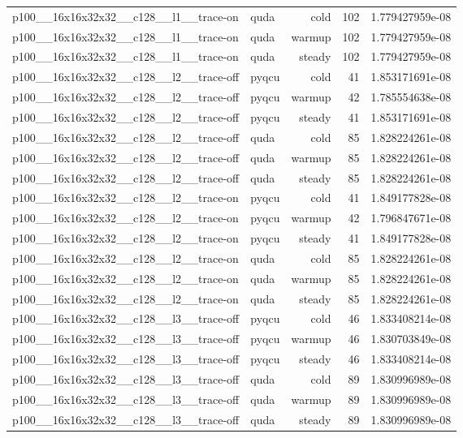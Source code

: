 \begin{table}[htbp]
\begin{tabular}{@{}llrrr@{}}
p100\_\_16x16x32x32\_\_c128\_\_l1\_\_trace-on & quda & cold & 102 & 1.779427959e-08 \\
p100\_\_16x16x32x32\_\_c128\_\_l1\_\_trace-on & quda & warmup & 102 & 1.779427959e-08 \\
p100\_\_16x16x32x32\_\_c128\_\_l1\_\_trace-on & quda & steady & 102 & 1.779427959e-08 \\
p100\_\_16x16x32x32\_\_c128\_\_l2\_\_trace-off & pyqcu & cold & 41 & 1.853171691e-08 \\
p100\_\_16x16x32x32\_\_c128\_\_l2\_\_trace-off & pyqcu & warmup & 42 & 1.785554638e-08 \\
p100\_\_16x16x32x32\_\_c128\_\_l2\_\_trace-off & pyqcu & steady & 41 & 1.853171691e-08 \\
p100\_\_16x16x32x32\_\_c128\_\_l2\_\_trace-off & quda & cold & 85 & 1.828224261e-08 \\
p100\_\_16x16x32x32\_\_c128\_\_l2\_\_trace-off & quda & warmup & 85 & 1.828224261e-08 \\
p100\_\_16x16x32x32\_\_c128\_\_l2\_\_trace-off & quda & steady & 85 & 1.828224261e-08 \\
p100\_\_16x16x32x32\_\_c128\_\_l2\_\_trace-on & pyqcu & cold & 41 & 1.849177828e-08 \\
p100\_\_16x16x32x32\_\_c128\_\_l2\_\_trace-on & pyqcu & warmup & 42 & 1.796847671e-08 \\
p100\_\_16x16x32x32\_\_c128\_\_l2\_\_trace-on & pyqcu & steady & 41 & 1.849177828e-08 \\
p100\_\_16x16x32x32\_\_c128\_\_l2\_\_trace-on & quda & cold & 85 & 1.828224261e-08 \\
p100\_\_16x16x32x32\_\_c128\_\_l2\_\_trace-on & quda & warmup & 85 & 1.828224261e-08 \\
p100\_\_16x16x32x32\_\_c128\_\_l2\_\_trace-on & quda & steady & 85 & 1.828224261e-08 \\
p100\_\_16x16x32x32\_\_c128\_\_l3\_\_trace-off & pyqcu & cold & 46 & 1.833408214e-08 \\
p100\_\_16x16x32x32\_\_c128\_\_l3\_\_trace-off & pyqcu & warmup & 46 & 1.830703849e-08 \\
p100\_\_16x16x32x32\_\_c128\_\_l3\_\_trace-off & pyqcu & steady & 46 & 1.833408214e-08 \\
p100\_\_16x16x32x32\_\_c128\_\_l3\_\_trace-off & quda & cold & 89 & 1.830996989e-08 \\
p100\_\_16x16x32x32\_\_c128\_\_l3\_\_trace-off & quda & warmup & 89 & 1.830996989e-08 \\
p100\_\_16x16x32x32\_\_c128\_\_l3\_\_trace-off & quda & steady & 89 & 1.830996989e-08 \\

\end{tabular}
\end{table}
